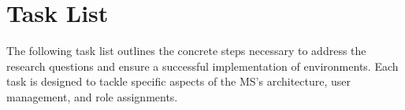\begin{enumerate}






\end{enumerate}


\section{Task List}
\label{cha:tasklist}

The following task list outlines the concrete steps necessary to address the research
questions and ensure a successful implementation of environments.
Each task is designed to tackle specific aspects of the MS's
architecture, user management, and role assignments.



